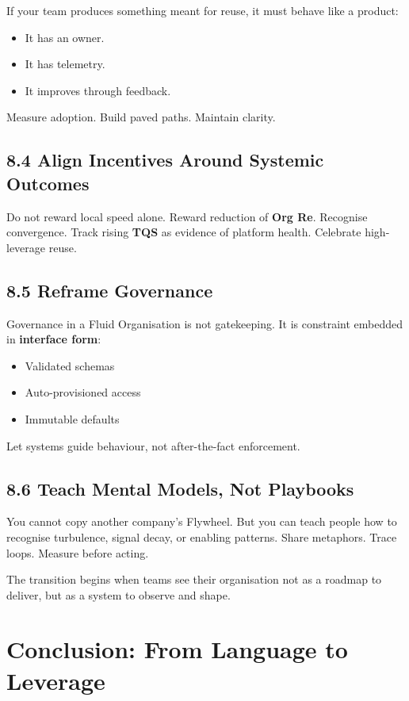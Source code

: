 \documentclass[12pt]{article}
\begin{document}
If your team produces something meant for reuse, it must behave like a product:
\begin{itemize}
    \item It has an owner.
    \item It has telemetry.
    \item It improves through feedback.
\end{itemize}

Measure adoption. Build paved paths. Maintain clarity.

\subsection*{8.4 Align Incentives Around Systemic Outcomes}

Do not reward local speed alone. Reward reduction of \textbf{Org Re}. Recognise convergence. Track rising \textbf{TQS} as evidence of platform health. Celebrate high-leverage reuse.

\subsection*{8.5 Reframe Governance}

Governance in a Fluid Organisation is not gatekeeping. It is constraint embedded in \textbf{interface form}:
\begin{itemize}
    \item Validated schemas
    \item Auto-provisioned access
    \item Immutable defaults
\end{itemize}

Let systems guide behaviour, not after-the-fact enforcement.

\subsection*{8.6 Teach Mental Models, Not Playbooks}

You cannot copy another company’s Flywheel. But you can teach people how to recognise turbulence, signal decay, or enabling patterns. Share metaphors. Trace loops. Measure before acting.

The transition begins when teams see their organisation not as a roadmap to deliver, but as a system to observe and shape.

\section{Conclusion: From Language to Leverage}
\end{document}

